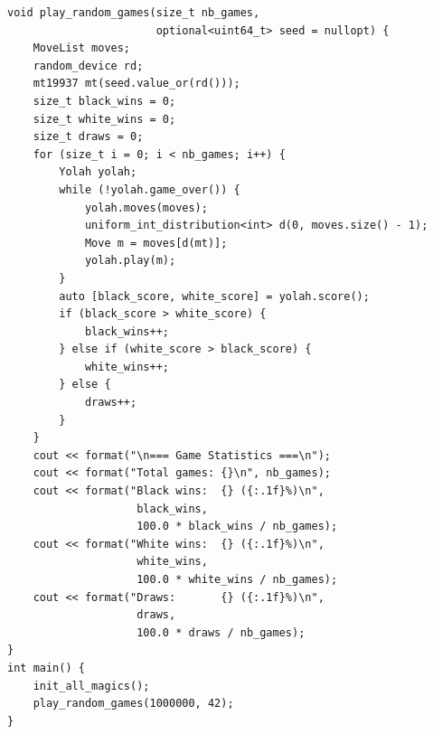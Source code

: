 \documentclass[12pt,a4paper,twoside,openright]{book}
\begin{document}
\begin{mdframed}[skipabove=\baselineskip,topline=false,rightline=false,bottomline=false,leftline=false,linewidth=1pt,linecolor=gray!40,innerleftmargin=8pt]
\begin{verbatim}
void play_random_games(size_t nb_games, 
                       optional<uint64_t> seed = nullopt) {
    MoveList moves;
    random_device rd;
    mt19937 mt(seed.value_or(rd()));
    size_t black_wins = 0;
    size_t white_wins = 0;
    size_t draws = 0;
    for (size_t i = 0; i < nb_games; i++) {
        Yolah yolah;    
        while (!yolah.game_over()) {                 
            yolah.moves(moves);
            uniform_int_distribution<int> d(0, moves.size() - 1);
            Move m = moves[d(mt)];
            yolah.play(m);
        }
        auto [black_score, white_score] = yolah.score();
        if (black_score > white_score) {
            black_wins++;
        } else if (white_score > black_score) {
            white_wins++;
        } else {
            draws++;
        }
    }
    cout << format("\n=== Game Statistics ===\n");
    cout << format("Total games: {}\n", nb_games);
    cout << format("Black wins:  {} ({:.1f}%)\n", 
                    black_wins, 
                    100.0 * black_wins / nb_games);
    cout << format("White wins:  {} ({:.1f}%)\n", 
                    white_wins, 
                    100.0 * white_wins / nb_games);
    cout << format("Draws:       {} ({:.1f}%)\n", 
                    draws, 
                    100.0 * draws / nb_games);
}
int main() {
    init_all_magics();
    play_random_games(1000000, 42);
}
\end{verbatim}
\label{lst:random_games_perf1}
\end{mdframed}


\end{document}
